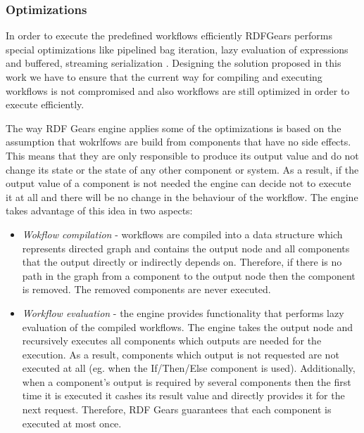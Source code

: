 \subsubsection{Optimizations}

In order to execute the predefined workflows efficiently RDFGears performs special optimizations like pipelined bag iteration, lazy evaluation of expressions and buffered, streaming serialization \cite{feliksik2011}. Designing the solution proposed in this work we have to ensure that the current way for compiling and executing workflows is not compromised and also workflows are still optimized in order to execute efficiently. 

The way RDF Gears engine applies some of the optimizations is based on the assumption that wokrlfows are build from components that have no side effects. This means that they are only responsible to produce its output value and do not change its state or the state of any other component or system. As a result, if the output value of a component is not needed the engine can decide not to execute it at all and there will be no change in the behaviour of the workflow. The engine takes advantage of this idea in two aspects:
	\begin{itemize}
		\item \textit{Wokflow compilation} - workflows are compiled into a data structure which represents directed graph and contains the output node and all components that the output directly or indirectly depends on. Therefore, if there is no path in the graph from a component to the output node then the component is removed. The removed components are never executed.
		
		\item \textit{Workflow evaluation} - the engine provides functionality that performs lazy evaluation of the compiled workflows. The engine takes the output node and recursively executes all components which outputs are needed for the execution. As a result, components which output is not requested are not executed at all (eg. when the If/Then/Else component is used). Additionally, when a component's output is required by several components then the first time it is executed it cashes its result value and directly provides it for the next request. Therefore, RDF Gears guarantees that each component is executed at most once.
\end{itemize}
